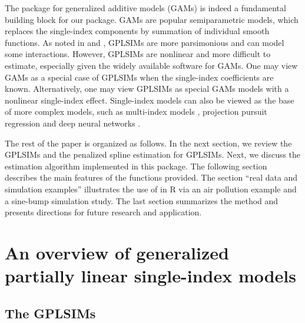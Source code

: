 The  package for generalized additive models (GAMs) is indeed a fundamental building block for our  package. GAMs \citep{Hastie1986,Wood_fast_2011} are popular semiparametric models, which replaces the single-index components by summation of individual smooth functions. As noted in \citet{carroll_generalized_1997} and \citet{yu_penalized_2002}, GPLSIMs are more parsimonious and can model some interactions. However, GPLSIMs are nonlinear and more difficult to estimate, especially given the widely available software for GAMs. One may view GAMs as a special case of GPLSIMs when the single-index coefficients are known. Alternatively, one may view GPLSIMs as special GAMs models with a nonlinear single-index effect. Single-index models can also be viewed as the base of more complex models, such as multi-index models \citep{xia_multiple_index_2008}, projection pursuit regression \citep{hall_projection_1989} and deep neural networks \citep{yang_high_dimensional_2017}. 

The rest of the paper is organized as follows. In the next section, we review the GPLSIMs and the penalized spline estimation for GPLSIMs. Next, we discuss the estimation algorithm implemented in this package. The following section describes the main features of the functions provided. The section ``real data and simulation examples'' illustrates the use of  in R via an air pollution example and a sine-bump simulation study. The last section summarizes the method and presents directions for future research and application.

\section{An overview of generalized partially linear single-index models}

\subsection{The GPLSIMs}

